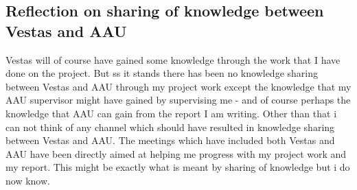 \subsection{Reflection on sharing of knowledge between Vestas and AAU}
Vestas will of course have gained some knowledge through the work that I have done on the project. But ss it stands there has been no knowledge sharing between Vestas and AAU through my project work except the knowledge that my AAU supervisor might have gained by supervising me - and of course perhaps the knowledge that AAU can gain from the report I am writing. Other than that i can not think of any channel which should have resulted in knowledge sharing between Vestas and AAU. The meetings which have included both Vestas and AAU have been directly aimed at helping me progress with my project work and my report. This might be exactly what is meant by sharing of knowledge but i do now know.
